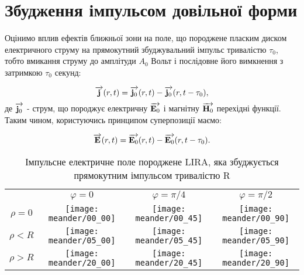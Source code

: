 
\section{Збудження імпульсом довільної форми}

Оцінимо вплив ефектів ближньої зони на поле, що породжене пласким диском 
електричного струму на прямокутний збуджувальний імпульс тривалістю 
$ \tau_0 $, тобто вмикання струму до амплітуди $ A_0 $ Вольт і послідовне 
його вимкнення з затримкою $ \tau_0 $ секунд:

\begin{equation}
\overrightarrow{\mathbf j} (r,t) = \overrightarrow{\mathbf j_0} (r,t) - \overrightarrow{\mathbf j_0} (r,t-\tau_0),
\end{equation}
%
де $ \overrightarrow{\mathbf j_0} $ - струм, що породжує електричну $ \overrightarrow{\mathbf E_0} $ і магнітну 
$ \overrightarrow{\mathbf H_0} $ перехідні функції. Таким чином, користуючись принципом 
суперпозиції маємо:

\begin{equation}
\overrightarrow{\mathbf E} (r,t) = \overrightarrow{\mathbf E_0} (r,t) - \overrightarrow{\mathbf E_0} (r,t-\tau_0).
\end{equation}

\begin{table}[ht]
\caption{Імпульсне електричне поле породжене LIRA, яка збуджується 
прямокутним імпульсом тривалістю R} \label{tab:meander_shape}
\centering
\begin{tabular}{cccc}

& $ \varphi = 0 $ & $ \varphi = \pi/4 $ & $ \varphi = \pi/2 $ \\

$ \rho = 0 $ &
\texttt{[image: meander/00\_00]} & 
\texttt{[image: meander/00\_45]} & 
\texttt{[image: meander/00\_90]} \\

$ \rho < R $ &
\texttt{[image: meander/05\_00]} & 
\texttt{[image: meander/05\_45]} & 
\texttt{[image: meander/05\_90]} \\

$ \rho > R $ &
\texttt{[image: meander/20\_00]} & 
\texttt{[image: meander/20\_45]} & 
\texttt{[image: meander/20\_90]} \\

\end{tabular}
\end{table}

